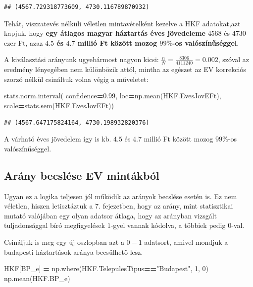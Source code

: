 \documentclass[
]{book}
\newenvironment{Shaded}{\begin{snugshade}}{\end{snugshade}}
\newcommand{\DecValTok}[1]{\textcolor[rgb]{0.00,0.00,0.81}{#1}}
\newcommand{\FloatTok}[1]{\textcolor[rgb]{0.00,0.00,0.81}{#1}}
\newcommand{\NormalTok}[1]{#1}
\newcommand{\OperatorTok}[1]{\textcolor[rgb]{0.81,0.36,0.00}{\textbf{#1}}}
\newcommand{\StringTok}[1]{\textcolor[rgb]{0.31,0.60,0.02}{#1}}
\begin{document}
\begin{verbatim}
## (4567.729318773609, 4730.116789870932)
\end{verbatim}

Tehát, viszzatevés nélküli véletlen mintavételként kezelve a HKF adatokat,azt kapjuk, hogy \textbf{egy átlagos magyar háztartás éves jövedeleme} \(4568\) és \(4730\) ezer Ft, azaz \textbf{\(4.5\) és \(4.7\) millió Ft között mozog \(99\%\)-os valószínűséggel}.

A kiválasztási arányunk ugyebármost nagyon kicsi: \(\frac{n}{N}=\frac{8306}{4111240}=0.002\), szóval az eredmény lényegében nem különbözik attól, mintha az egészet az EV korrekciós szorzó nélkül csináltuk volna végig a műveletet:

\begin{Shaded}
\begin{Highlighting}[]
\NormalTok{stats.norm.interval(}
\NormalTok{  confidence}\OperatorTok{=}\FloatTok{0.99}\NormalTok{,}
\NormalTok{  loc}\OperatorTok{=}\NormalTok{np.mean(HKF.EvesJovEFt),}
\NormalTok{  scale}\OperatorTok{=}\NormalTok{stats.sem(HKF.EvesJovEFt))}
\end{Highlighting}
\end{Shaded}

\begin{verbatim}
## (4567.647175824164, 4730.198932820376)
\end{verbatim}

A várható éves jövedelem így is kb. \(4.5\) és \(4.7\) millió Ft között mozog \(99\%\)-os valószínűséggel.

\subsection{Arány becslése EV mintákból}\label{aruxe1ny-becsluxe9se-ev-mintuxe1kbuxf3l}

Ugyan ez a logika teljesen jól működik az arányok becslése esetén is. Ez nem véletlen, hiszen letisztáztuk a 7. fejezetben, hogy az arány, mint statisztikai mutató valójában egy olyan adatsor átlaga, hogy az arányban vizsgált tuljadonsággal bíró megfigyelések \(1\)-gyel vannak kódolva, a többiek pedig \(0\)-val.

Csináljuk is meg egy új oszlopban azt a \(0-1\) adatsort, amivel mondjuk a budapesti háztartások aránya becsülhető lesz.

\begin{Shaded}
\begin{Highlighting}[]
\NormalTok{HKF[}\StringTok{\textquotesingle{}BP\_e\textquotesingle{}}\NormalTok{] }\OperatorTok{=}\NormalTok{ np.where(HKF.TelepulesTipus}\OperatorTok{==}\StringTok{"Budapest"}\NormalTok{, }\DecValTok{1}\NormalTok{, }\DecValTok{0}\NormalTok{)}
\NormalTok{np.mean(HKF.BP\_e)}
\end{Highlighting}
\end{Shaded}
\end{document}
